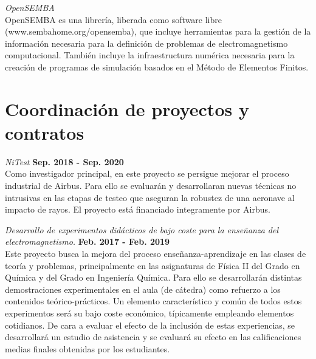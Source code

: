 \documentclass[a4paper,margin,line]{res}
\begin{document}
\begin{resume}
\begin{minipage}{\textwidth}
 {\em OpenSEMBA}\\
 OpenSEMBA es una librería, liberada como software libre (www.sembahome.org/opensemba), que incluye herramientas para la gestión de la información necesaria para la definición de problemas de electromagnetismo computacional. También incluye la infraestructura numérica necesaria para la creación de programas de simulación basados en el Método de Elementos Finitos.
\end{minipage}

\section{\sc Coordinación de proyectos y contratos}
\begin{minipage}{\textwidth}
	{\em NiTest} \hfill {\bf Sep. 2018 - Sep. 2020}\\
	Como investigador principal, en este proyecto se persigue mejorar el proceso industrial de Airbus. Para ello se evaluarán y desarrollaran nuevas técnicas no intrusivas en las etapas de testeo que aseguran la robustez de una aeronave al impacto de rayos. El proyecto está financiado integramente por Airbus.
\end{minipage}	


\begin{minipage}{\textwidth}
  {\em Desarrollo de experimentos didácticos de bajo coste para la enseñanza del electromagnetismo.} \hfill {\bf Feb. 2017 - Feb. 2019}\\
  Este proyecto busca la mejora del proceso enseñanza-aprendizaje en las clases de teoría y problemas, principalmente en las asignaturas de Física II del Grado en Química y del Grado en Ingeniería Química. Para ello se desarrollarán distintas demostraciones experimentales en el aula (de cátedra) como refuerzo a los contenidos teórico-prácticos. Un elemento característico y común de todos estos experimentos será su bajo coste económico, típicamente empleando elementos cotidianos. De cara a evaluar el efecto de la inclusión de estas experiencias, se desarrollará un estudio de asistencia y se evaluará su efecto en las calificaciones medias finales obtenidas por los estudiantes.
\end{minipage}


\end{resume}
\end{document}
